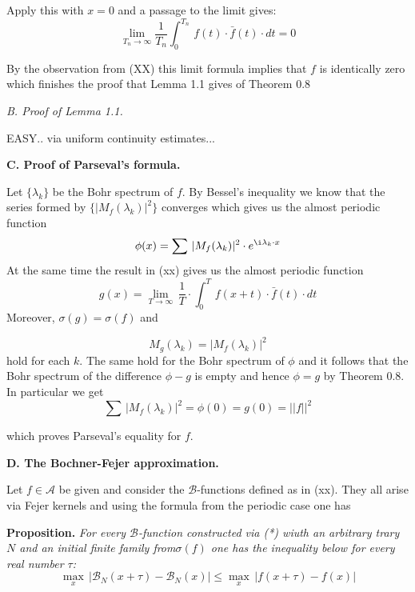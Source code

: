 \documentclass{amsart}
\def\uuu{_}
\def\vvv{-}
\begin{document}
\noindent
Apply this  with $x=0$ and a passage to the limit
gives:
\[
\lim\uuu{T\uuu n\to\infty}
\frac{1}{T\uuu n}\int\uuu 0^{T\uuu n}\,f(t)\cdot \bar f(t)\cdot dt=0
\]
\medskip

\noindent
By the observation from (XX) this limit formula implies that
$f$ is identically zero which finishes the proof that Lemma 1.1 gives
of Theorem 0.8

\bigskip

\centerline{\emph{B. Proof of Lemma 1.1.}}
\bigskip

EASY.. via uniform continuity estimates...

\bigskip
\centerline{\bf{C. Proof of Parseval's formula.}}

\bigskip

\noindent
Let $\{\lambda\uuu k\}$ be the Bohr spectrum of $f$.
By Bessel's inequality we know that the series
formed by $\{|M\uuu f(\lambda\uuu k)|^2\}$
converges which gives us the almost periodic function
\[
\phi(x)=\sum\, |M\uuu f(\lambda\uuu k)|^2\cdot e^{\i\lambda\uuu k\cdot x}
\]
At the same time the result in (xx) gives us the almost periodic function
\[
g(x)=\lim\uuu{T\to \infty}\,
\frac{1}{T}\cdot\int\uuu 0^T\, f(x+t)\cdot \bar f(t)\cdot dt
\]
Moreover, $\sigma(g)=\sigma(f)$ and

\[ 
M\uuu g(\lambda\uuu k)=|M\uuu f(\lambda\uuu k)|^2
\] 
hold for each $k$.
The same hold for the Bohr spectrum of $\phi$
and it follows that the Bohr spectrum of the difference $\phi\vvv g$
is empty and hence $\phi=g$ by Theorem 0.8.
In particular we get
\[
\sum\, |M\uuu f(\lambda\uuu k)|^2=\phi(0)=g(0)=
||f||^2
\] 

\noindent
which proves Parseval's equality for $f$.

\bigskip

\centerline
{\bf{D. The Bochner\vvv Fejer approximation.}}
\bigskip

\noindent
Let $f\in\mathcal{A}$ be given and
consider the $\mathcal B$\vvv functions defined as in (xx).
They all arise via Fejer kernels and using
the formula from the periodic case one has

\medskip

\noindent
{\bf{Proposition.}}
\emph{For every $\mathcal B$\vvv function constructed via (*) wiuth
an arbitrary trary $N$ and an initial finite family from$\sigma(f)$ one has
the inequality below for every real number $\tau$:}
\[
\max\uuu x\, |\mathcal B\uuu N(x+\tau)\vvv \mathcal B\uuu N(x)|\leq
\max\uuu x\, |f(x+\tau)\vvv f(x)|
\]
\bigskip
\end{document}
